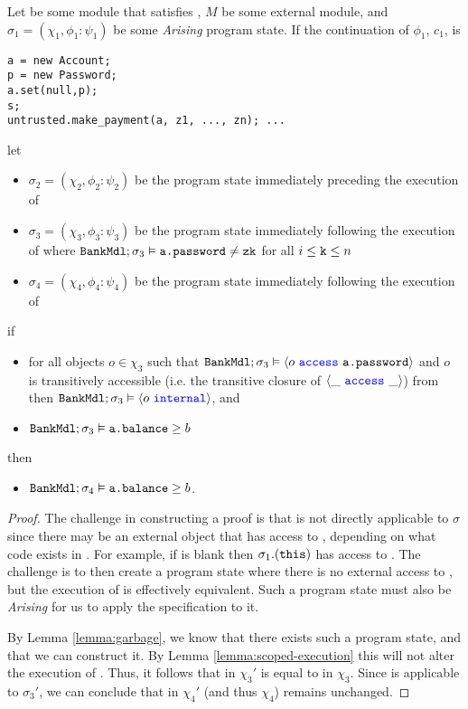 \begin{theorem}
\label{thm:safety}
Let  be some module that satisfies \SrobustB, 
$M$ be some external module, and $\sigma_1 = (\chi_1, \phi_1 : \psi_1)$ be some \textit{Arising} program state. If the continuation of $\phi_1$, $c_1$, is
\begin{verbatim}
a = new Account; 
p = new Password; 
a.set(null,p); 
s; 
untrusted.make_payment(a, z1, ..., zn); ...
\end{verbatim}
let 
\begin{itemize}
\item
$\sigma_2 = (\chi_2, \phi_2 : \psi_2)$ be the program state immediately preceding the execution of 
\item
$\sigma_3 = (\chi_3, \phi_3 : \psi_3)$ be the program state immediately following the execution of  where ${\texttt{BankMdl}};\sigma_3 \vDash {\texttt{a.password}} \neq {\texttt{zk}}$ for all $i \leq {\texttt{k}} \leq n$
\item
$\sigma_4 = (\chi_4, \phi_4 : \psi_4)$ be the program state immediately following the execution of\\  
\end{itemize}
if 
\begin{itemize}
\item
for all objects $o \in \chi_3$ such that ${\texttt{BankMdl}}; \sigma_3 \vDash \langle o\ {\color{blue}\texttt{access}}\ {\texttt{a.password}} \rangle$ and $o$ is transitively accessible (i.e. the transitive closure of $\langle \_\ {\color{blue}\texttt{access}}\ \_ \rangle$) from 
then ${\texttt{BankMdl}}; \sigma_3 \vDash \langle o\ {\color{blue}\texttt{internal}}\rangle$, and
\item
${\texttt{BankMdl}}; \sigma_3 \vDash {\texttt{a.balance}}\geq b$
\end{itemize}
then 
\begin{itemize}
\item
${\texttt{BankMdl}};\sigma_4 \vDash {\texttt{a.balance}} \geq b$.
\end{itemize}
\end{theorem}
\begin{proof}
The challenge in constructing a proof is that \SrobustB is not directly applicable to $\sigma$ since there may be an external 
object that has access to , depending on what code exists in . For example, if  
is blank then $\sigma_1.({\texttt{this}})$ has access to . The challenge is to then create 
a program state where there is no external access to , but the execution of 
is effectively equivalent. Such a program state must also be \textit{Arising} for us to apply the \Nec specification 
\SrobustB to it.

By Lemma \ref{lemma:garbage}, we know that there exists such a program state, and that we can construct it. By Lemma \ref{lemma:scoped-execution} this will 
not alter the execution of .
Thus, it follows that  in $\chi_3'$ is equal to  in $\chi_3$.
Since \SrobustB is applicable to $\sigma_3'$, we can conclude that  in $\chi_4'$ (and thus $\chi_4$)
remains unchanged.
\end{proof}




